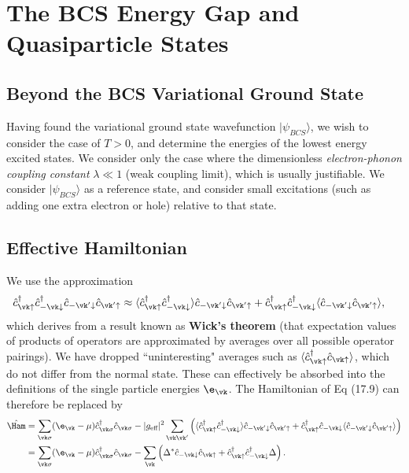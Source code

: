\documentclass[a4paper, 11pt, normalem]{report}
\begin{document}
\chapter{The BCS Energy Gap and Quasiparticle States}
\section{Beyond the BCS Variational Ground State}
Having found the variational ground state wavefunction $|\psi_{BCS}\rangle$, we wish to consider the case of $T>0$, and determine the energies of the lowest energy excited states.
We consider only the case where the dimensionless \emph{electron-phonon coupling constant} $\lambda\ll1$ (weak coupling limit), which is usually justifiable.
We consider $|\psi_{BCS}\rangle$ as a reference state, and consider small excitations (such as adding one extra electron or hole) relative to that state.

\section{Effective Hamiltonian}
We use the approximation
\begin{align}
    \hat{c}_{\vk\uparrow}^\dagger\hat{c}_{-\vk\downarrow}^\dagger\hat{c}_{-\vk'\downarrow}\hat{c}_{\vk'\uparrow} &\approx \langle\hat{c}_{\vk\uparrow}^\dagger\hat{c}_{-\vk\downarrow}^\dagger\rangle\hat{c}_{-\vk'\downarrow}\hat{c}_{\vk'\uparrow}+\hat{c}_{\vk\uparrow}^\dagger\hat{c}_{-\vk\downarrow}^\dagger\langle\hat{c}_{-\vk'\downarrow}\hat{c}_{\vk'\uparrow}\rangle,
\end{align}
which derives from a result known as \textbf{Wick's theorem} (that expectation values of products of operators are approximated by averages over all possible operator pairings).
We have dropped ``uninteresting" averages such as $\langle\hat{c}_{\vk\uparrow}^\dagger\hat{c}_{\vk\uparrow}\rangle$, which do not differ from the normal state.
These can effectively be absorbed into the definitions of the single particle energies $\e_{\vk}$.
The Hamiltonian of Eq (17.9) can therefore be replaced by
\begin{align}
    \begin{split}
        \hat{\Ham} &= \sum_{\vk\sigma} (\e_{\vk}-\mu)\hat{c}_{\vk\sigma}^\dagger\hat{c}_{\vk\sigma} - |g_{\text{eff}}|^2\sum_{\vk\vk'}\left(\langle\hat{c}_{\vk\uparrow}^\dagger\hat{c}_{-\vk\downarrow}^\dagger\rangle\hat{c}_{-\vk'\downarrow}\hat{c}_{\vk'\uparrow}+\hat{c}_{\vk\uparrow}^\dagger\hat{c}_{-\vk\downarrow}\langle\hat{c}_{-\vk'\downarrow}\hat{c}_{\vk'\uparrow}\rangle\right) \\
                   &= \sum_{\vk\sigma} (\e_{\vk}-\mu)\hat{c}_{\vk\sigma}^\dagger\hat{c}_{\vk\sigma} - \sum_{\vk} \left(\Delta^*\hat{c}_{-\vk\downarrow}\hat{c}_{\vk\uparrow}+\hat{c}_{\vk\uparrow}^\dagger\hat{c}_{-\vk\downarrow}^\dagger\Delta\right).
    \end{split}
\end{align}
\end{document}
